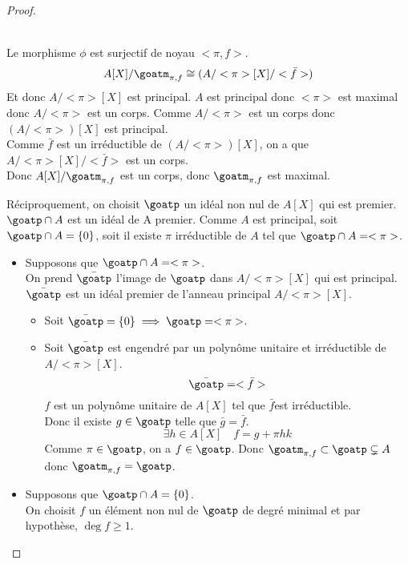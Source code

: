 \begin{proof}
\begin{itemize}
\begin{centering}
		      \end{centering}\\
		      Le morphisme $\phi$ est surjectif de noyau $<\pi,f>$.
		      $$ A[X]/\goatm_{\pi,f} \cong (A/<\pi>[X]/<\bar{f}>)$$
		      Et donc $A/<\pi>[X]$ est principal.
		      $A$ est principal donc $<\pi>$ est maximal donc $A/<\pi>$ est un corps. Comme $A/<\pi>$ est un corps donc $(A/<\pi>)[X]$ est principal.\\
		      Comme $\bar{f}$ est un irréductible de $(A/<\pi>)[X]$, on a que $A/<\pi>[X]/<\bar{f}>$ est un corps.\\
		      Donc $A[X]/\goatm_{\pi,f}$ est un corps, donc $\goatm_{\pi,f}$ est maximal.
	\end{itemize}
	\vspace{0.25cm}
	\noindent Réciproquement, on choisit $\goatp$ un idéal non nul de $A[X]$ qui est premier. \\
	$\goatp \cap A$ est un idéal de A premier.
	Comme $A$ est principal, soit $\goatp \cap A = \{0\}$, soit il existe $\pi$ irréductible de $A$ tel que $\goatp \cap A = <\pi>$.
	\begin{itemize}
		\item Supposons que $\goatp \cap A = <\pi>$.\\
		      On prend $\bar{\goatp}$ l'image de $\goatp$ dans $A/<\pi>[X]$ qui est principal.\\
		      $\bar{\goatp}$ est un idéal premier de l'anneau principal $A/<\pi>[X]$.\\
		      \begin{itemize}
			      \item Soit $\bar{\goatp} = \{0\} \implies \goatp = <\pi>$.
			      \item Soit $\bar{\goatp}$ est engendré par un polynôme unitaire et irréductible de $A/<\pi>[X]$.
			            $$ \bar{\goatp} = <\bar{f}> $$
			            $f$ est un polynôme unitaire de $A[X]$ tel que $\bar{f}$est irréductible. \\
			            Donc il existe $g \in \goatp$ telle que $\bar{g} = \bar{f}$.
			            $$ \exists h \in A[X] \quad f = g + \pi h k$$
			            Comme $\pi \in \goatp$, on a $f \in \goatp$.
			            Donc $\goatm_{\pi,f} \subset \goatp \subsetneq A$
			            donc $\goatm_{\pi,f} = \goatp$.
		      \end{itemize}
		\item Supposons que $\goatp \cap A = \{0\}$.\\
		      On choisit $f$ un élément non nul de $\goatp$ de degré minimal et par hypothèse, $\deg f \geq 1$.\\

\end{itemize}
\end{proof}
